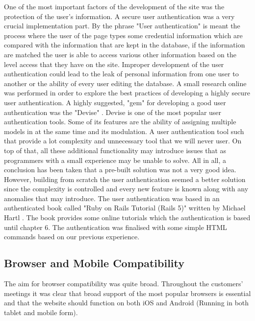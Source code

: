 \documentclass{l3proj}
\begin{document}
One of the most important factors of the development of the site was the protection of the user's information.  A secure user authentication was a very crucial implementation part. By the phrase "User authentication" \cite{authentication} is meant the process where the user of the page types some credential information which are compared with the information that are kept in the database, if the information are matched the user is able to access various other information based on the level access that they have on the site. Improper development of the user authentication could lead to the leak of personal information from one user to another or the ability of every user editing the database. A small research online was performed in order to explore the best practices of developing a highly secure user authentication. A highly suggested, "gem" for developing a good user authentication was the "Devise" \cite{devise}. Devise is one of the most popular user authentication tools. Some of its features are the ability of assigning multiple models in at the same time and its modulation. A user authentication tool such that provide a lot complexity and unnecessary tool that we will never user. On top of that, all these additional functionality may introduce issues that as programmers with a small experience may be unable to solve. All in all, a conclusion has been taken that a pre-built solution was not a very good idea. However, building from scratch the user authentication seemed a better solution since the complexity is controlled and every new feature is known along with any anomalies that may introduce. The user authentication was based in an authenticated book called "Ruby on Rails Tutorial (Rails 5)" written by Michael Hartl \cite{railsTut}. The book provides some online tutorials which the authentication is based until chapter 6. The authentication was finalised with some simple HTML commands based on our previous experience.


\subsection{Browser and Mobile Compatibility}
\label{sec:compatibility}

The aim for browser compatibility was quite broad. Throughout the customers' meetings it was clear that broad support of the most popular browsers is essential and that the website should function on both iOS and Android (Running in both tablet and mobile form).
\end{document}
